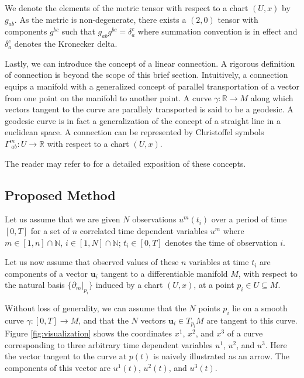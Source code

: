 \documentclass[a4paper,11pt]{elsarticle}
\begin{document}
We denote the elements of the metric tensor with respect to a chart
$(U, x)$ by $g_{ab}$. As the metric is non-degenerate, there exists a
$(2, 0)$ tensor with components $g^{bc}$ such that $g_{ab} g^{bc} =
\delta_{a}^{c}$ where summation convention is in effect and
$\delta_{a}^{c}$ denotes the Kronecker delta.

Lastly, we can introduce the concept of a linear connection. A
rigorous definition of connection is beyond the scope of this brief
section. Intuitively, a connection equips a manifold with a
generalized concept of parallel transportation of a vector from one
point on the manifold to another point. A curve $\gamma: \mathbb{R}
\to M$ along which vectors tangent to the curve are parallely
transported is said to be a geodesic. A geodesic curve is in fact a
generalization of the concept of a straight line in a euclidean space.
A connection can be represented by Christoffel symbols
$\Gamma^{m}_{\;ab}: U \to \mathbb{R}$ with respect to a chart $(U,
x)$.

The reader may refer to \cite{deFelice-1990} for a detailed exposition
of these concepts.

\subsection{Proposed Method}
\label{subsection:method}

Let us assume that we are given $N$ observations $u^{m}(t_{i})$ over a
period of time $[0,T]$ for a set of $n$ correlated time dependent
variables $u^{m}$ where $m \in [1,n] \cap \mathbb{N}$, $i \in [1,N]
\cap \mathbb{N}$; $t_{i} \in [0,T]$ denotes the time of observation
$i$.

Let us now assume that observed values of these $n$ variables at time
$t_{i}$ are components of a vector $\mathbf{u}_{i}$ tangent to a
differentiable manifold $M$, with respect to the natural basis
$\{\partial_{m}|_{p_{i}}\}$ induced by a chart $(U, x)$, at a point
$p_{i} \in U \subseteq M$. 

Without loss of generality, we can assume that the $N$ points $p_{i}$
lie on a smooth curve $\gamma:[0,T] \to M$, and that the $N$ vectors
$\mathbf{u}_{i} \in T_{p_{i}}M$ are tangent to this curve. Figure
\ref{fig:visualization} shows the coordinates $x^{1}$, $x^{2}$, and
$x^{3}$ of a curve corresponding to three arbitrary time dependent
variables $u^{1}$, $u^{2}$, and $u^{3}$. Here the vector tangent to
the curve at $p(t)$ is naively illustrated as an arrow. The components
of this vector are $u^{1}(t)$, $u^{2}(t)$, and $u^{3}(t)$.
\end{document}
